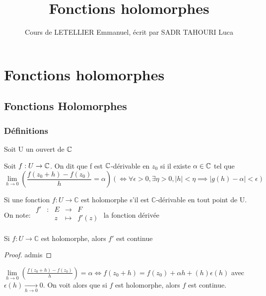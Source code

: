 \documentclass[]{report}
\title{Fonctions holomorphes}
\author{Cours de LETELLIER Emmanuel, écrit par SADR TAHOURI Luca}
\date{}
\begin{document}
    \maketitle
    \tableofcontents
    
\chapter{Fonctions holomorphes}

\section{Fonctions Holomorphes}

\subsection{Définitions}

Soit U un ouvert de $\mathbb{C}$\\

\begin{df} 
    Soit $f:U \to \mathbb{C}$. On dit que f est $\mathbb{C}$-dérivable en $z_0$ si il existe $\alpha \in \mathbb{C}$ tel que
\[\lim\limits_{h \to 0} \left(\frac{f(z_0+h)-f(z_0)}{h}=\alpha\right) (\iff \forall \epsilon >0, \exists\eta>0,|h|<\eta \implies|g(h)-\alpha|<\epsilon)\]
\end{df}

\begin{df} 
    Si une fonction $f:U \to \mathbb{C}$ est holomorphe s'il est $\mathbb{C}$-dérivable en tout point de U. On note:
$\begin{array}{ccccc}
f' & : & E & \to & F \\
 & & z & \mapsto & f'(z) \\
\end{array}$ la fonction dérivée
\end{df} 

\begin{tm} 
    Si $f:U \to \mathbb{C}$ est holomorphe, alors $f'$ est continue
\end{tm}

\begin{proof}
    admis
\end{proof}

\begin{re}{}{}
    $\lim\limits_{h \to 0} \left(\frac{f(z_0+h)-f(z_0)}{h}\right)=\alpha \iff f(z_0+h)=f(z_0)+\alpha h +(h)\epsilon (h)$ avec $\epsilon(h)\underset{h\to 0}{\longrightarrow} 0$. On voit alors que si $f$ est holomorphe, alors $f$ est continue.
\end{re}
\end{document}
